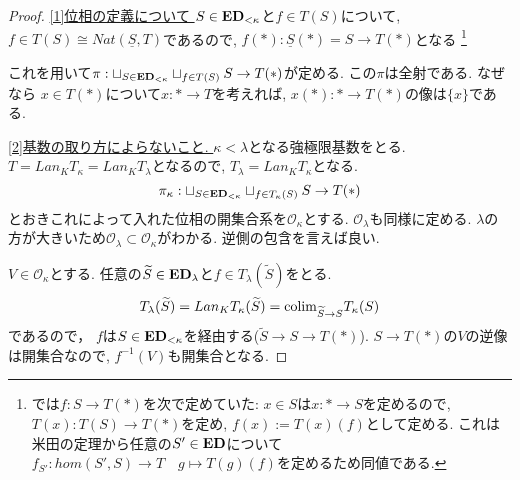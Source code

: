\documentclass[dvipdfmx,a4paper,11pt]{article}
\newcommand{\colim}{{\rm colim}}
\theoremstyle{definition}
\newcommand{\xr}[1]{\textcolor{red}{#1}}
\begin{document}
\begin{proof}
\underline{[1]位相の定義について }
$S \in {\bf ED}_{<\kappa}$と$f \in T(S)$について, 
$f \in T(S) \cong Nat(\underline{S}, T)$であるので, 
$f(\ast) : \underline{S}(\ast)=S \to T(\ast)$となる
\footnote{\cite{Bar22}では$f : S \to T(\ast)$を次で定めていた: $x \in S$は$x : \ast \to S$を定めるので, $T(x) : T(S) \to T(\ast)$を定め, $f(x):=T(x)(f)$として定める. これは米田の定理から任意の$S' \in {\bf ED}$について$f_{S'} : hom(S', S) \to T \quad g \mapsto T(g)(f)$を定めるため同値である.}

これを用いて$\pi : \sqcup_{S \in {\bf ED}_{<\kappa}}  \sqcup_{f \in T(S) }  S \to T(\ast)$が定める. 
この$\pi$は全射である. なぜなら
$x \in T(\ast)$について$x : \ast \to T$を考えれば,
$x(\ast) : \ast \to T(\ast)$の像は$\{ x\}$である. 


\underline{[2]基数の取り方によらないこと. }
$\kappa < \lambda$となる強極限基数をとる.
$T = Lan_{K}T_{\kappa} = Lan_{K}T_{\lambda} $となるので,
$T_{\lambda} =Lan_{K}T_{\kappa} $となる.
$$
\pi_{\kappa} : \sqcup_{S \in {\bf ED}_{<\kappa}}  \sqcup_{f \in T_{\kappa}(S) }  S \to T(\ast)
$$
とおきこれによって入れた位相の開集合系を$\mathcal{O}_{\kappa}$とする.
$\mathcal{O}_{\lambda}$も同様に定める.
$\lambda$の方が大きいため$\mathcal{O}_{\lambda} \subset \mathcal{O}_{\kappa}$がわかる.
逆側の包含を言えば良い.

$V \in \mathcal{O}_{\kappa}$とする. 
任意の$\widetilde{S} \in {\bf ED}_{\lambda}$と$f \in T_{\lambda}(\widetilde{S})$をとる.
$$
 T_{\lambda}(\widetilde{S})=Lan_{K}T_{\kappa}(\widetilde{S})
 = \colim_{\widetilde{S} \to S} T_{\kappa}(S)
$$
であるので， $f$は$S \in { \bf ED}_{< \kappa}$を経由する($\widetilde{S} \to S \to T(\ast)$).
$S \to T(\ast)$の$V$の逆像は開集合なので, $f^{-1}(V)$も開集合となる.
\end{proof}
\end{document}
